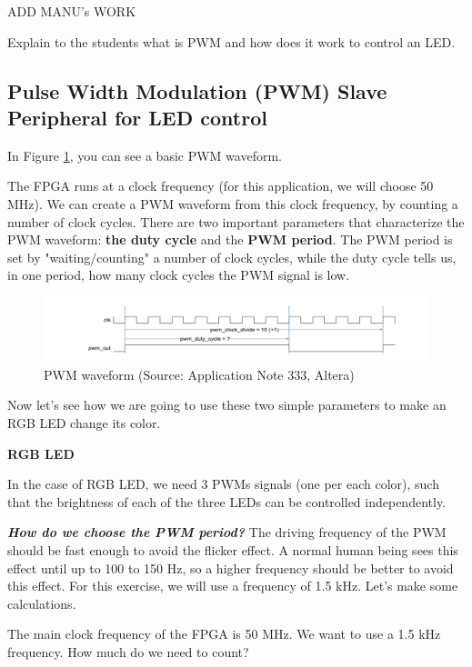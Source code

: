 \documentclass{article}
\begin{document}
ADD MANU's WORK


{\color{red} Explain to the students what is PWM and how does it work to control an LED.}

\subsection{Pulse Width Modulation (PWM) Slave Peripheral for LED control}


In Figure \ref{fig:pwm_waveform}, you can see a basic PWM waveform.  

The FPGA runs at a clock frequency (for this application, we will choose 50 MHz). We can create a PWM waveform  from this clock frequency, by counting a number of clock cycles. There are two important parameters that characterize the PWM waveform: \textbf{the duty cycle} and the \textbf{PWM period}. The PWM  period is set by "waiting/counting" a number of clock cycles,  while the duty cycle  tells us, in one period, how many clock cycles the PWM signal is low.


\begin{figure}[h!]
    \centering
    \includegraphics[width=\textwidth]{img/pwm_waveform.png}
    \caption{PWM waveform (Source: Application Note 333, Altera)}
    \label{fig:pwm_waveform}
\end{figure}

Now let's see how we are going to use these two simple parameters to make an RGB LED change its color.


\textbf{RGB LED}

In the case of RGB LED, we need 3 PWMs signals (one per each color), such that the brightness of each of the three LEDs can be controlled independently.

\textbf{\textit{How do we choose the PWM period?}} The driving frequency of the PWM should be fast enough to avoid the flicker effect. A normal human being sees this effect until up to 100 to 150 Hz, so a higher frequency should be better to avoid this effect. For this exercise, we will use a frequency of 1.5 kHz. Let's make some calculations.

The main clock frequency of the FPGA is 50 MHz. We want to use a 1.5 kHz frequency. How much do we need to count?
\end{document}
